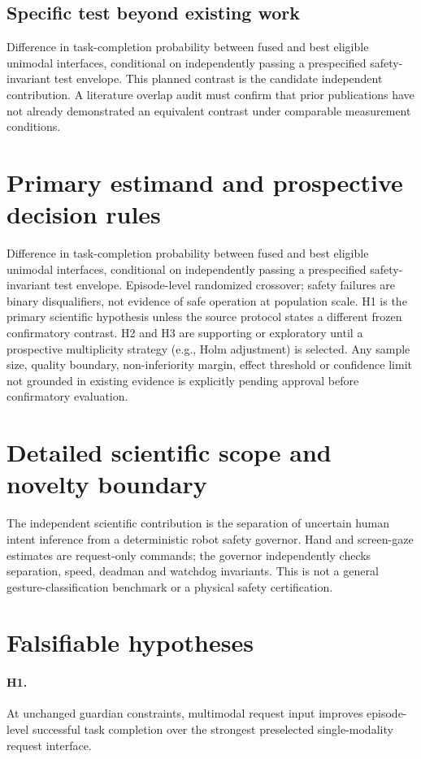 \documentclass[11pt,a4paper]{article}
\begin{document}
\subsection{Specific test beyond existing work}
Difference in task-completion probability between fused and best eligible unimodal interfaces, conditional on independently passing a prespecified safety-invariant test envelope. This planned contrast is the candidate independent contribution. A literature overlap audit must confirm that prior publications have not already demonstrated an equivalent contrast under comparable measurement conditions.

\section{Primary estimand and prospective decision rules}
Difference in task-completion probability between fused and best eligible unimodal interfaces, conditional on independently passing a prespecified safety-invariant test envelope. Episode-level randomized crossover; safety failures are binary disqualifiers, not evidence of safe operation at population scale. H1 is the primary scientific hypothesis unless the source protocol states a different frozen confirmatory contrast. H2 and H3 are supporting or exploratory until a prospective multiplicity strategy (e.g., Holm adjustment) is selected. Any sample size, quality boundary, non-inferiority margin, effect threshold or confidence limit not grounded in existing evidence is explicitly pending approval before confirmatory evaluation.

\section{Detailed scientific scope and novelty boundary}
The independent scientific contribution is the separation of uncertain human intent inference from a deterministic robot safety governor. Hand and screen-gaze estimates are request-only commands; the governor independently checks separation, speed, deadman and watchdog invariants. This is not a general gesture-classification benchmark or a physical safety certification.

\section{Falsifiable hypotheses}
\paragraph{H1.} At unchanged guardian constraints, multimodal request input improves episode-level successful task completion over the strongest preselected single-modality request interface.
\end{document}
